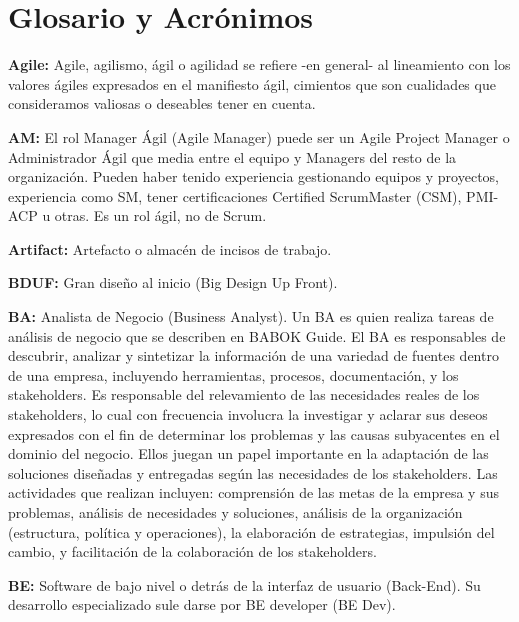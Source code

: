 \chapter{Glosario y Acrónimos}


  \begin{description}    
  
  \item {\textbf{Agile:} Agile, agilismo, ágil o agilidad se refiere -en general- al lineamiento con los valores ágiles expresados en el manifiesto ágil, cimientos que son cualidades que consideramos valiosas o deseables tener en cuenta.}
  
  \item {\textbf{AM:} El rol Manager Ágil (Agile Manager) puede ser un Agile Project Manager o Administrador Ágil que media entre el equipo y Managers del resto de la organización. Pueden haber tenido experiencia gestionando equipos y proyectos, experiencia como SM, tener certificaciones Certified ScrumMaster (CSM), PMI-ACP u otras. Es un rol ágil, no de Scrum. } 
   
  \item {\textbf{Artifact:} Artefacto o almacén de incisos de trabajo.}  
 
  \item {\textbf{BDUF:} Gran diseño al inicio (Big Design Up Front).}  
  
  \item {\textbf{BA:} Analista de Negocio (Business Analyst). Un BA es quien realiza tareas de análisis de negocio que se describen en BABOK Guide. El BA es responsables de descubrir, analizar y sintetizar la información de una variedad de fuentes dentro de una empresa, incluyendo herramientas, procesos, documentación, y los stakeholders. Es responsable del relevamiento de las necesidades reales de los stakeholders, lo cual con frecuencia involucra la investigar y aclarar sus deseos expresados con el fin de determinar los problemas y las causas subyacentes en el dominio del negocio. Ellos juegan un papel importante en la adaptación de las soluciones diseñadas y entregadas según las necesidades de los stakeholders. Las actividades que realizan incluyen: comprensión de las metas de la empresa y sus problemas, análisis de necesidades y soluciones, análisis de la organización (estructura, política y operaciones), la elaboración de estrategias, impulsión del cambio, y facilitación de la colaboración de los stakeholders.}
   
  \item {\textbf{BE:} Software de bajo nivel o detrás de la interfaz de usuario (Back-End). Su desarrollo especializado sule darse por BE developer (BE Dev).}
 

\end{description}
